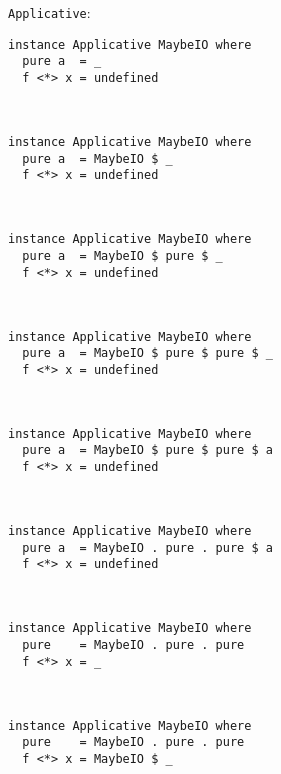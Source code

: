 \documentclass{beamer}
\begin{document}
\begin{frame}[fragile]
\texttt{Applicative}:
\begin{overprint}
\begin{verbatim}
instance Applicative MaybeIO where
  pure a  = _
  f <*> x = undefined
  
                 
\end{verbatim}
\begin{verbatim}
instance Applicative MaybeIO where
  pure a  = MaybeIO $ _
  f <*> x = undefined
  
                 
\end{verbatim}
\begin{verbatim}
instance Applicative MaybeIO where
  pure a  = MaybeIO $ pure $ _
  f <*> x = undefined
  
                 
\end{verbatim}
\begin{verbatim}
instance Applicative MaybeIO where
  pure a  = MaybeIO $ pure $ pure $ _
  f <*> x = undefined
  
                 
\end{verbatim}
\begin{verbatim}
instance Applicative MaybeIO where
  pure a  = MaybeIO $ pure $ pure $ a
  f <*> x = undefined
  
                 
\end{verbatim}
\begin{verbatim}
instance Applicative MaybeIO where
  pure a  = MaybeIO . pure . pure $ a
  f <*> x = undefined
  
                 
\end{verbatim}
\begin{verbatim}
instance Applicative MaybeIO where
  pure    = MaybeIO . pure . pure
  f <*> x = _
  
                 
\end{verbatim}
\begin{verbatim}
instance Applicative MaybeIO where
  pure    = MaybeIO . pure . pure
  f <*> x = MaybeIO $ _
  

\end{verbatim}
\end{overprint}
\end{frame}
\end{document}
